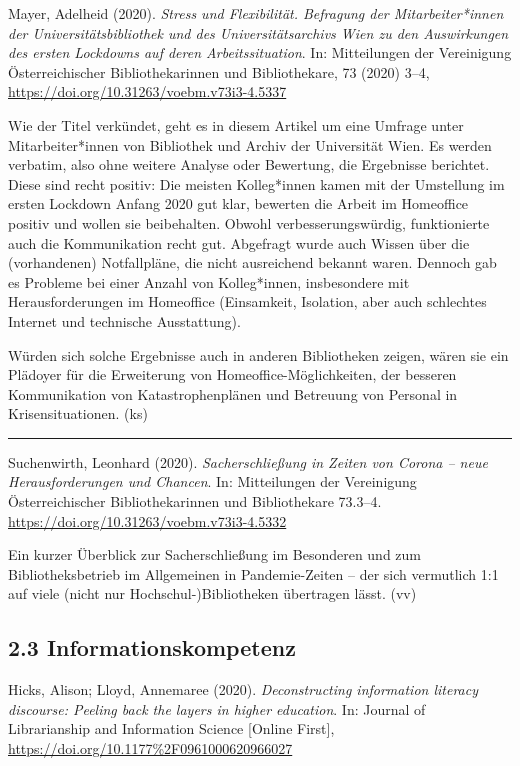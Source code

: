 \documentclass[a4paper,
fontsize=11pt,
oneside,
numbers=noperiodatend,
parskip=half-,
bibliography=totoc,
final
]{scrartcl}
\begin{document}
Mayer, Adelheid (2020). \emph{Stress und Flexibilität. Befragung der
Mitarbeiter*innen der Universitätsbibliothek und des Universitätsarchivs
Wien zu den Auswirkungen des ersten Lockdowns auf deren
Arbeitssituation}. In: Mitteilungen der Vereinigung Österreichischer
Bibliothekarinnen und Bibliothekare, 73 (2020) 3--4,
\url{https://doi.org/10.31263/voebm.v73i3-4.5337}

Wie der Titel verkündet, geht es in diesem Artikel um eine Umfrage unter
Mitarbeiter*innen von Bibliothek und Archiv der Universität Wien. Es
werden verbatim, also ohne weitere Analyse oder Bewertung, die
Ergebnisse berichtet. Diese sind recht positiv: Die meisten Kolleg*innen
kamen mit der Umstellung im ersten Lockdown Anfang 2020 gut klar,
bewerten die Arbeit im Homeoffice positiv und wollen sie beibehalten.
Obwohl verbesserungswürdig, funktionierte auch die Kommunikation recht
gut. Abgefragt wurde auch Wissen über die (vorhandenen) Notfallpläne,
die nicht ausreichend bekannt waren. Dennoch gab es Probleme bei einer
Anzahl von Kolleg*innen, insbesondere mit Herausforderungen im
Homeoffice (Einsamkeit, Isolation, aber auch schlechtes Internet und
technische Ausstattung).

Würden sich solche Ergebnisse auch in anderen Bibliotheken zeigen, wären
sie ein Plädoyer für die Erweiterung von Homeoffice-Möglichkeiten, der
besseren Kommunikation von Katastrophenplänen und Betreuung von Personal
in Krisensituationen. (ks)

\begin{center}\rule{0.5\linewidth}{0.5pt}\end{center}

Suchenwirth, Leonhard (2020). \emph{Sacherschließung in Zeiten von
Corona -- neue Herausforderungen und Chancen}. In: Mitteilungen der
Vereinigung Österreichischer Bibliothekarinnen und Bibliothekare
73.3--4. \url{https://doi.org/10.31263/voebm.v73i3-4.5332}

Ein kurzer Überblick zur Sacherschließung im Besonderen und zum
Bibliotheksbetrieb im Allgemeinen in Pandemie-Zeiten -- der sich
vermutlich 1:1 auf viele (nicht nur Hochschul-)Bibliotheken übertragen
lässt. (vv)

\hypertarget{informationskompetenz}{%
\subsection{2.3 Informationskompetenz}\label{informationskompetenz}}

Hicks, Alison; Lloyd, Annemaree (2020). \emph{Deconstructing information
literacy discourse: Peeling back the layers in higher education}. In:
Journal of Librarianship and Information Science {[}Online First{]},
\url{https://doi.org/10.1177\%2F0961000620966027}
\end{document}
